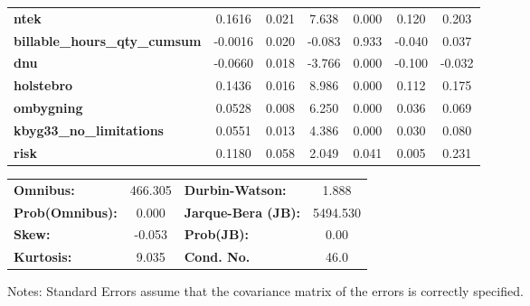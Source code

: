 \begin{center}
\begin{tabular}{lcccccc}
\textbf{ntek}                            &       0.1616  &        0.021     &     7.638  &         0.000        &        0.120    &        0.203     \\
\textbf{billable\_hours\_qty\_cumsum}    &      -0.0016  &        0.020     &    -0.083  &         0.933        &       -0.040    &        0.037     \\
\textbf{dnu}                             &      -0.0660  &        0.018     &    -3.766  &         0.000        &       -0.100    &       -0.032     \\
\textbf{holstebro}                       &       0.1436  &        0.016     &     8.986  &         0.000        &        0.112    &        0.175     \\
\textbf{ombygning}                       &       0.0528  &        0.008     &     6.250  &         0.000        &        0.036    &        0.069     \\
\textbf{kbyg33\_no\_limitations}         &       0.0551  &        0.013     &     4.386  &         0.000        &        0.030    &        0.080     \\
\textbf{risk}                            &       0.1180  &        0.058     &     2.049  &         0.041        &        0.005    &        0.231     \\
\bottomrule
\end{tabular}
\begin{tabular}{lclc}
\textbf{Omnibus:}       & 466.305 & \textbf{  Durbin-Watson:     } &    1.888  \\
\textbf{Prob(Omnibus):} &   0.000 & \textbf{  Jarque-Bera (JB):  } & 5494.530  \\
\textbf{Skew:}          &  -0.053 & \textbf{  Prob(JB):          } &     0.00  \\
\textbf{Kurtosis:}      &   9.035 & \textbf{  Cond. No.          } &     46.0  \\
\bottomrule
\end{tabular}
\end{center}

Notes: \newline
 [1] Standard Errors assume that the covariance matrix of the errors is correctly specified.